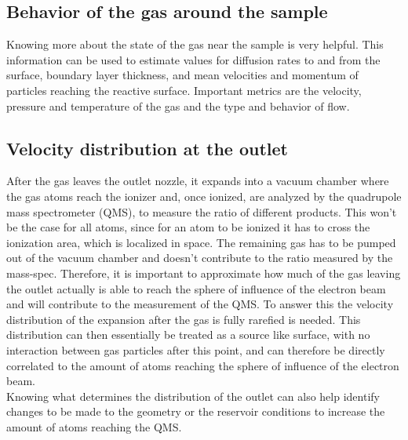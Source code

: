 \subsection{Behavior of the gas around the sample}

	Knowing more about the state of the gas near the sample is very helpful.
	This information can be used to estimate values for diffusion rates to and from the surface, boundary layer thickness, and mean velocities and momentum of particles reaching the reactive surface. 
	Important metrics are the velocity, pressure and temperature of the gas and the type and behavior of flow.

\subsection{Velocity distribution at the outlet}

	After the gas leaves the outlet nozzle, it expands into a vacuum chamber where the gas atoms reach the ionizer and, once ionized, are analyzed by the quadrupole mass spectrometer (QMS), to measure the ratio of different products.
	This won't be the case for all atoms, since for an atom to be ionized it has to cross the ionization area, which is localized in space.
	The remaining gas has to be pumped out of the vacuum chamber and doesn't contribute to the ratio measured by the mass-spec.
	Therefore, it is important to approximate how much of the gas leaving the outlet actually is able to reach the sphere of influence of the electron beam and will contribute to the measurement of the QMS.
	To answer this the velocity distribution of the expansion after the gas is fully rarefied is needed.
	This distribution can then essentially be treated as a source like surface, with no interaction between gas particles after this point, and can therefore be directly correlated to the amount of atoms reaching the sphere of influence of the electron beam.\\
	Knowing what determines the distribution of the outlet can also help identify changes to be made to the geometry or the reservoir conditions to increase the amount of atoms reaching the QMS.
